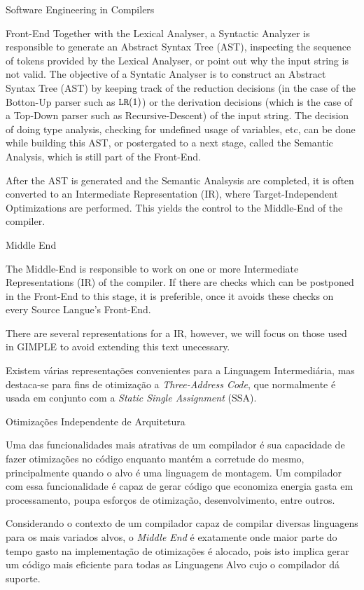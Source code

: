 \begin{section}{Software Engineering in Compilers}
\begin{subsection}{Front-End}
Together with the Lexical Analyser, a Syntactic Analyzer is responsible to
generate an Abstract Syntax Tree (AST), inspecting the sequence of tokens
provided by the Lexical Analyser, or point out why the input string is
not valid. The objective of a Syntatic Analyser is to construct
an Abstract Syntax Tree (AST) by keeping track of the reduction decisions
(in the case of the Botton-Up parser such as $\texttt{LR}(1)$) or the derivation
decisions (which is the case of a Top-Down parser such as Recursive-Descent)
of the input string. The decision of doing type analysis, checking for
undefined usage of variables, etc, can be done while building this
AST, or postergated to a next stage, called the Semantic Analysis,
which is still part of the Front-End.

After the AST is generated and the Semantic Analsysis are completed, it is
often converted to an Intermediate Representation (IR), where Target-Independent
Optimizations are performed. This yields the control to the Middle-End of
the compiler.

\end{subsection}

\begin{subsection}{Middle End}

The Middle-End is responsible to work on one or more Intermediate Representations
(IR) of the compiler. If there are checks which can be postponed in the Front-End
to this stage, it is preferible, once it avoids these checks on every Source
Langue's Front-End.

There are several representations for a IR, however, we will focus on those
used in GIMPLE to avoid extending this text unecessary.

Existem várias representações convenientes para a Linguagem Intermediária,
mas destaca-se para fins de otimização
a \textit{Three-Address Code}, que normalmente é usada em conjunto com
a \textit{Static Single Assignment} (SSA).


\begin{subsubsection}{Otimizações Independente de Arquitetura}

Uma das funcionalidades mais atrativas de um compilador é sua
capacidade de fazer otimizações no código enquanto mantém
a corretude do mesmo, principalmente quando
o alvo é uma linguagem de montagem. Um compilador com essa
funcionalidade é capaz de gerar código que economiza energia
gasta em processamento, poupa esforços de otimização, desenvolvimento,
entre outros.

Considerando o contexto de um compilador capaz de compilar
diversas linguagens para os mais variados alvos, o \textit{Middle End} é
exatamente onde maior parte do tempo gasto na implementação de otimizações é
alocado, pois isto implica gerar um código mais eficiente para todas as
Linguagens Alvo cujo o compilador dá suporte.


\end{subsubsection}
\end{subsection}
\end{section}
